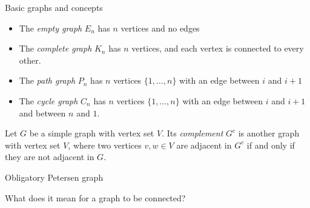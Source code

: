 \documentclass{beamer}
\begin{document}
\begin{frame}{Basic graphs and concepts}
  \begin{itemize}
  \item The \emph{empty graph} $E_n$ has $n$ vertices and no edges
  \item The \emph{complete graph} $K_n$ has $n$ vertices, and each vertex is connected to every other.
  \item The \emph{path graph} $P_n$ has $n$ vertices $\{1,\dots,n\}$ with an edge between $i$ and $i+1$
    \item The \emph{cycle graph} $C_n$ has $n$ vertices $\{1,\dots, n\}$ with an edge between $i$ and $i+1$ and between $n$ and $1$.

  \end{itemize}

\begin{definition}Let $G$ be a simple graph with vertex set $V$.  Its \emph{complement} $G^c$ is another graph with vertex set $V$, where two vertices $v,w\in V$ are adjacent in $G^c$ if and only if they are not adjacent in $G$. \end{definition}
  
\end{frame}

\begin{frame}{Obligatory Petersen graph}
  \begin{center}
\end{center}
\end{frame}

\begin{frame}[plain,c]

\begin{center}

\Huge

What does it mean for a graph to be connected?
\end{center}

\end{frame}
\end{document}
